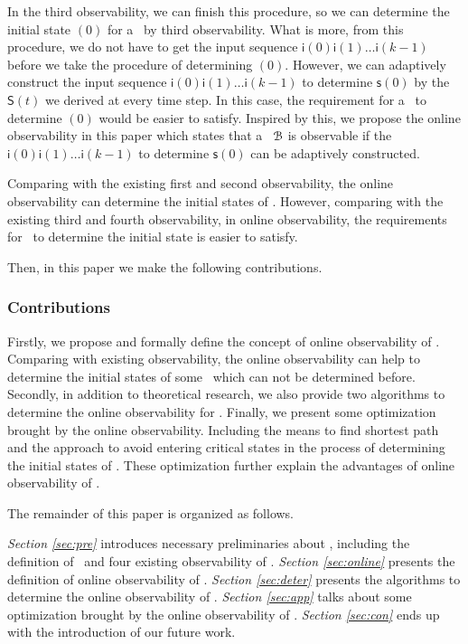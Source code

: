 In the third observability, we can finish this procedure, so we can determine the initial state \State$(0)$ for a \BCN\ by third observability. What is more, from this procedure, we do not have to get the input sequence $\mathsf{i}(0)\mathsf{i}(1)\ldots\mathsf{i}(k-1)$ before we take the procedure of determining \State$(0)$. However, we can adaptively construct the input sequence $\mathsf{i}(0)\mathsf{i}(1)\ldots\mathsf{i}(k-1)$ to determine $\mathsf{s}(0)$ by the $\mathsf{S}(t)$ we derived at every time step. In this case, the requirement for a \BCN\ to determine \State$(0)$ would be easier to satisfy. Inspired by this, we propose the online observability in this paper which states that a \BCN\ ${\mathcal{B}}$ is observable if the $\mathsf{i}(0)\mathsf{i}(1)\ldots\mathsf{i}(k-1)$ to determine $\mathsf{s}(0)$ can be adaptively constructed. 

Comparing with the existing first and second observability, the online observability can determine the initial states of \BCNs. However, comparing with the existing third and fourth observability, in online observability, the requirements for \BCNs\ to determine the initial state is easier to satisfy.  

Then, in this paper we make the following contributions. 
\subsubsection*{Contributions}
Firstly, we propose and formally define the concept of online observability of \BCNs. Comparing with existing observability, the online observability can help to determine the initial states of some \BCNs\ which can not be determined before. Secondly, in addition to theoretical research, we also provide two algorithms to determine the online observability for \BCNs. Finally, we present some optimization brought by the online observability. Including the means to find shortest path and the approach to avoid entering critical states in the process of determining the initial states of \BCNs.  These optimization further explain the advantages of online observability of \BCNs. 

The remainder of this paper is organized as follows.

 {\em Section \ref{sec:pre}} introduces necessary preliminaries about \BCNs, including the definition of \BCNs\ and four existing observability of \BCNs. {\em Section \ref{sec:online}} presents the definition of online observability of \BCNs. {\em Section \ref{sec:deter}} presents the algorithms to determine the online observability of \BCNs. {\em Section \ref{sec:app}} talks about some optimization brought by the online observability of \BCNs. {\em Section \ref{sec:con}} ends up with the introduction of our future work.


